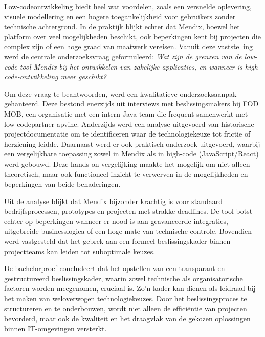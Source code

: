 Low-codeontwikkeling biedt heel wat voordelen, zoals een versnelde oplevering, visuele modellering en een hogere toegankelijkheid voor gebruikers zonder technische achtergrond. In de praktijk blijkt echter dat Mendix, hoewel het platform over veel mogelijkheden beschikt, ook beperkingen kent bij projecten die complex zijn of een hoge graad van maatwerk vereisen. Vanuit deze vaststelling werd de centrale onderzoeksvraag geformuleerd: \textit{Wat zijn de grenzen van de low-code-tool Mendix bij het ontwikkelen van zakelijke applicaties, en wanneer is high-code-ontwikkeling meer geschikt?}

Om deze vraag te beantwoorden, werd een kwalitatieve onderzoeksaanpak gehanteerd. Deze bestond enerzijds uit interviews met beslissingsmakers bij \gls{FOD MOB}, een organisatie met een intern Java-team die frequent samenwerkt met low-codepartner apvine. Anderzijds werd een analyse uitgevoerd van historische projectdocumentatie om te identificeren waar de technologiekeuze tot frictie of herziening leidde. Daarnaast werd er ook praktisch onderzoek uitgevoerd, waarbij een vergelijkbare toepassing zowel in Mendix als in high-code (JavaScript/React) werd gebouwd. Deze hands-on vergelijking maakte het mogelijk om niet alleen theoretisch, maar ook functioneel inzicht te verwerven in de mogelijkheden en beperkingen van beide benaderingen.

Uit de analyse blijkt dat Mendix bijzonder krachtig is voor standaard bedrijfsprocessen, prototypes en projecten met strakke deadlines. De tool botst echter op beperkingen wanneer er nood is aan geavanceerde integraties, uitgebreide businesslogica of een hoge mate van technische controle.
Bovendien werd vastgesteld dat het gebrek aan een formeel beslissingskader binnen projectteams kan leiden tot suboptimale keuzes.

De bachelorproef concludeert dat het opstellen van een transparant en gestructureerd beslissingskader, waarin zowel technische als organisatorische factoren worden meegenomen, cruciaal is. Zo’n kader kan dienen als leidraad bij het maken van weloverwogen technologiekeuzes. Door het beslissingsproces te structureren en te onderbouwen, wordt niet alleen de efficiëntie van projecten bevorderd, maar ook de kwaliteit en het draagvlak van de gekozen oplossingen binnen IT-omgevingen versterkt.



